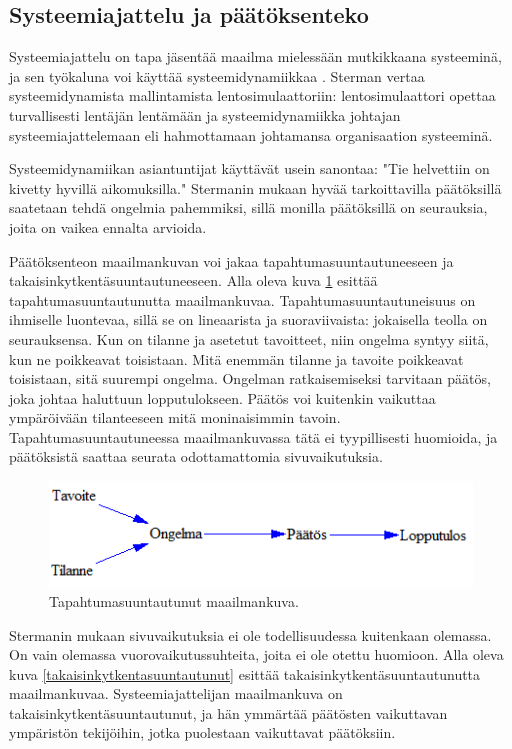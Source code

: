 \documentclass[finnish,12pt,a4paper,pdftex]{article}
\begin{document}
\begin{onehalfspacing}
\subsection{Systeemiajattelu ja päätöksenteko \label{sysdyn:paatos}}

Systeemiajattelu on tapa jäsentää maailma mielessään mutkikkaana systeeminä, ja sen työkaluna voi käyttää systeemidynamiikkaa \cite[s. 4--5]{Sterman2000}. Sterman \cite[s. 4--5]{Sterman2000} vertaa systeemidynamista mallintamista lentosimulaattoriin: lentosimulaattori opettaa turvallisesti lentäjän lentämään ja systeemidynamiikka johtajan systeemiajattelemaan eli hahmottamaan johtamansa organisaation systeeminä. 

Systeemidynamiikan asiantuntijat käyttävät usein sanontaa: "Tie helvettiin on kivetty hyvillä aikomuksilla." Stermanin \cite[s. 5--6]{Sterman2000} mukaan hyvää tarkoittavilla päätöksillä saatetaan tehdä ongelmia pahemmiksi, sillä monilla päätöksillä on seurauksia, joita on vaikea ennalta arvioida. %

Päätöksenteon maailmankuvan voi jakaa tapahtumasuuntautuneeseen ja takaisinkytkentäsuuntautuneeseen. Alla oleva kuva \ref{tapahtuma} esittää tapahtumasuuntautunutta maailmankuvaa. Tapahtumasuuntautuneisuus on ihmiselle luontevaa, sillä se on lineaarista ja suoraviivaista: jokaisella teolla on seurauksensa. Kun on tilanne ja asetetut tavoitteet, niin ongelma syntyy siitä, kun ne poikkeavat toisistaan. Mitä enemmän tilanne ja tavoite poikkeavat toisistaan, sitä suurempi ongelma. Ongelman ratkaisemiseksi tarvitaan päätös, joka johtaa haluttuun lopputulokseen. Päätös voi kuitenkin vaikuttaa ympäröivään tilanteeseen mitä moninaisimmin tavoin. Tapahtumasuuntautuneessa maailmankuvassa tätä ei tyypillisesti huomioida, ja päätöksistä saattaa seurata odottamattomia sivuvaikutuksia. \cite[s. 10]{Sterman2000}

\begin{figure}[H]
\centering \includegraphics{tapahtuma}
\caption{Tapahtumasuuntautunut maailmankuva. \cite[s. 10]{Sterman2000} \label{tapahtuma}}
\end{figure}

Stermanin \cite[s. 11]{Sterman2000} mukaan sivuvaikutuksia ei ole todellisuudessa kuitenkaan olemassa. On vain olemassa vuorovaikutussuhteita, joita ei ole otettu huomioon. Alla oleva kuva \ref{takaisinkytkentasuuntautunut} esittää takaisinkytkentäsuuntautunutta maailmankuvaa. Systeemiajattelijan maailmankuva on takaisinkytkentäsuuntautunut, ja hän ymmärtää päätösten vaikuttavan ympäristön tekijöihin, jotka puolestaan vaikuttavat päätöksiin. 


\end{onehalfspacing}
\end{document}
